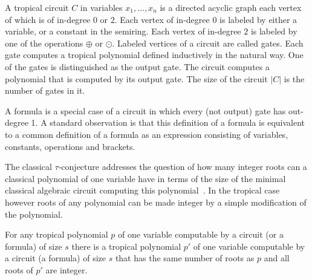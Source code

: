 \documentclass[11pt]{article}
\newcommand{\ta}{\oplus}
\newcommand{\tp}{\odot}
\begin{document}
A tropical circuit $C$ in variables $x_1, \ldots, x_n$ is a directed acyclic graph each vertex of which is of in-degree $0$ or $2$. Each vertex of in-degree 0 is labeled by either a variable, or a constant in the semiring. Each vertex of in-degree $2$ is labeled by one of the operations $\ta$ or $\tp$. Labeled vertices of a circuit are called gates. Each gate computes a tropical polynomial defined inductively in the natural way. One of the gates is distinguished as the output gate. The circuit computes a polynomial that is computed by its output gate. The size of the circuit $|C|$ is the number of gates in it. 

A formula is a special case of a circuit in which every (not output) gate has out-degree 1. A standard observation is that this definition of a formula is equivalent to a common definition of a formula as an expression consisting of variables, constants, operations and brackets. 

The classical $\tau$-conjecture addresses the question of how many integer roots can a classical polynomial of one variable have in terms of the size of the minimal classical algebraic circuit computing this polynomial~\cite{Blum98}. In the tropical case however roots of any polynomial can be made integer by a simple modification of the polynomial. 

\begin{lemma} \label{lem:roots_integer}
For any tropical polynomial $p$ of one variable computable by a circuit (or a formula) of size $s$ there is a tropical polynomial $p'$ of one variable computable by a circuit (a formula) of size $s$ that has the same number of roots as $p$ and all roots of $p'$ are integer. 
\end{lemma}
\end{document}

